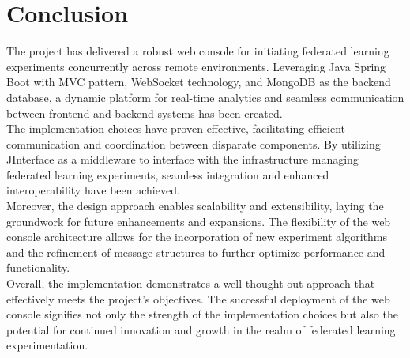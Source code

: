 \chapter{Conclusion}


The project has delivered a robust web console for initiating federated learning experiments 
concurrently across remote environments. Leveraging Java Spring Boot with MVC pattern, 
WebSocket technology, and MongoDB as the backend database, a dynamic platform for real-time 
analytics and seamless communication between frontend and backend systems has been created.
\\
The implementation choices have proven effective, facilitating efficient communication and 
coordination between disparate components. By utilizing JInterface as a middleware to interface 
with the infrastructure managing federated learning experiments, seamless integration and 
enhanced interoperability have been achieved.
\\
Moreover, the design approach enables scalability and extensibility, laying the groundwork 
for future enhancements and expansions. The flexibility of the web console architecture allows 
for the incorporation of new experiment algorithms and the refinement of message structures to 
further optimize performance and functionality.
\\
Overall, the implementation demonstrates a well-thought-out approach that effectively meets 
the project's objectives. The successful deployment of the web console signifies not only the 
strength of the implementation choices but also the potential for continued innovation and 
growth in the realm of federated learning experimentation.

